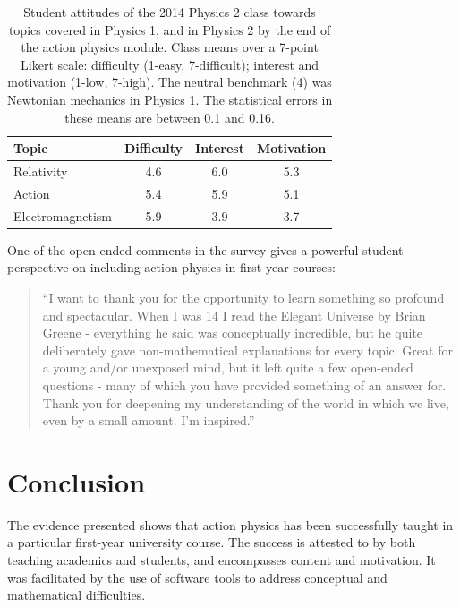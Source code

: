 \documentclass[prb,oncolumn,12pt]{revtex4-2}
\begin{document}
\begin{table}[t]
\centering
\caption{Student attitudes of the 2014 Physics 2 class towards topics covered in Physics 1, and in Physics 2 by the end of the action physics module. Class means over a 7-point Likert scale: difficulty (1-easy, 7-difficult); interest and motivation (1-low, 7-high). The neutral benchmark (4) was Newtonian mechanics in Physics 1. The statistical errors in these means are between 0.1 and 0.16.}
\begin{ruledtabular}
\begin{tabular}{l c c c }
Topic & Difficulty & Interest & Motivation \\
\hline	%
Relativity & 4.6 & 6.0 & 5.3  \\
Action & 5.4 & 5.9 & 5.1 \\
Electromagnetism & 5.9 & 3.9 & 3.7 \\
\end{tabular}
\end{ruledtabular}
\label{bosons}
\end{table}


One of the open ended comments in the survey gives a powerful student perspective on including action physics in first-year courses:
\begin{quote}
``I want to thank you for the opportunity to learn something so profound and spectacular. When I was 14 I read the Elegant Universe by Brian Greene - everything he said was conceptually incredible, but he quite deliberately gave non-mathematical explanations for every topic. Great for a young and/or unexposed mind, but it left quite a few open-ended questions - many of which you have provided something of an answer for. Thank you for deepening my understanding of the world in which we live, even by a small amount. I'm inspired.'' 
\end{quote}


\section{Conclusion}
\label{Conclusion}

The evidence presented shows that action physics has been successfully taught in a particular first-year university course. The success is attested to by both teaching academics and students, and encompasses content and motivation. It was facilitated by the use of software tools to address conceptual and mathematical difficulties. 
\end{document}
